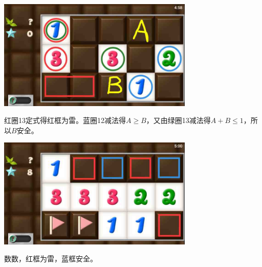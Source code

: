 \subsection{} %
\begin{center}
    \includegraphics[width=0.7\textwidth]{puzzlelow/75-1.jpg}
\end{center}
红圈13定式得红框为雷。蓝圈12减法得$A\ge B$，又由绿圈13减法得$A+B\le 1$，所以$B$安全。
\begin{center}
    \includegraphics[width=0.7\textwidth]{puzzlelow/75-2.jpg}
\end{center}
数数，红框为雷，蓝框安全。


